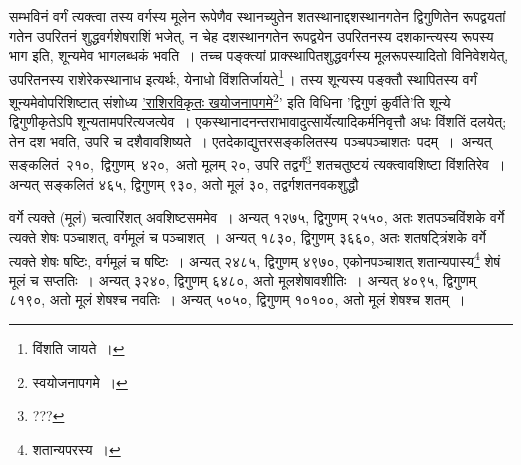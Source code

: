 \documentclass[10pt, openany]{book}
\begin{document}
{
{सम्भविनं वर्गं त्यक्त्वा तस्य वर्गस्य मूलेन रूपेणैव स्थानच्युतेन
शतस्थानाद्दशस्थानगतेन}
{द्विगुणितेन रूपद्वयतां गतेन उपरितनं शुद्धवर्गशेषराशिं भजेत्, न चेह
दशस्थानगतेन रूपद्वयेन}
{उपरितनस्य दशकान्त्यस्य रूपस्य भाग इति, शून्यमेव भागलब्धकं भवति~। तच्च
पङ्क्त्यां}
{प्राक्स्थापितशुद्धवर्गस्य मूलरूपस्यादितो विनिवेशयेत्, उपरितनस्य
राशेरेकस्थानाध इत्यर्थः,}
{येनाधो विंशतिर्जायते\renewcommand{\thefootnote}{\s ४}\footnote{\s विंशति जायते~।}\,। तस्य शून्यस्य पङ्क्तौ स्थापितस्य वर्गं
शून्यमेवोपरिशिष्टात् संशोध्य}
{\hyperref[21]{'राशिरविकृतः खयोजनापगमे\renewcommand{\thefootnote}{\s ५}\footnote{\s स्वयोजनापगमे~।}'} इति विधिना {\qt 'द्विगुणं कुर्वीते'}ति शून्ये
द्विगुणीकृतेऽपि शून्यतामपरित्यजत्येव~। एकस्थानादनन्तराभावादुत्सार्येत्यादिकर्मनिवृत्तौ अधः
विंशतिं दलयेत्;}
{तेन दश भवति, उपरि च दशैवावशिष्यते~। एतदेकाद्युत्तरसङ्कलितस्य \,पञ्चपञ्चाशतः \,पदम्~। \,अन्यत् \,सङ्कलितं \,२१०, \,द्विगुणम् \,४२०, \,अतो मूलम् २०, उपरि
तद्वर्गं\renewcommand{\thefootnote}{\s ६}\footnote{???} शतचतुष्टयं}
{त्यक्त्वावशिष्टा विंशतिरेव~। अन्यत् सङ्कलितं ४६५, द्विगुणम् ९३०, अतो
मूलं ३०, तद्वर्गशतनवकशुद्धौ}

\newpage

{वर्गे त्यक्ते (मूलं) चत्वारिंशत् अवशिष्टसममेव~। अन्यत् १२७५, द्विगुणम्
२५५०, अतः शतपञ्चविंशके वर्गे त्यक्ते शेषः पञ्चाशत्, वर्गमूलं च पञ्चाशत्~। अन्यत्
१८३०, द्विगुणम्}
{३६६०, अतः शतषट्त्रिंशके वर्गे त्यक्ते शेषः षष्टिः, वर्गमूलं च षष्टिः~।
अन्यत् २४८५, द्विगुणम्}
{४९७०, एकोनपञ्चाशत् शतान्यपास्य\renewcommand{\thefootnote}{\s १}\footnote{\s शतान्यपरस्य~।} शेषं मूलं च सप्ततिः~। अन्यत् ३२४०,
द्विगुणम्}
{६४८०, अतो मूलशेषावशीतिः~। अन्यत् ४०९५, द्विगुणम् ८१९०, अतो मूलं शेषश्च नवतिः~। अन्यत् ५०५०, द्विगुणम् १०१००, अतो मूलं शेषश्च शतम्~।}\\

}
\end{document}
